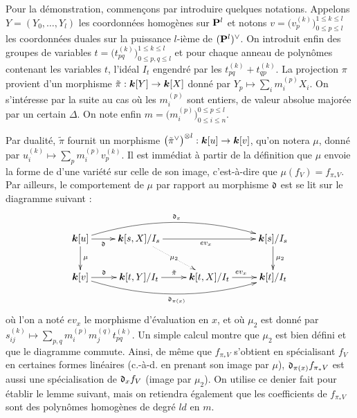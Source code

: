 Pour la démonstration, commençons par introduire quelques notations. Appelons
\( Y = (Y_0,\ldots, Y_l) \) les coordonnées homogènes sur \( {\mathbf{P}}^l \) et
notons \( v = \bigl(v_p^{(k)}\bigr)_{0\le p \le l}^{1 \le k \le l} \) les
coordonnées duales sur la puissance \( l \)-ième de \( ({\mathbf{P}}^l)^\vee \). On
introduit enfin des groupes de variables \( t = \bigl(t_{pq}^{(k)}\bigr)_{0\le
    p, q \le l}^{1 \le k \le l} \) et pour chaque anneau de polynômes
contenant les variables \( t \), l'idéal \( I_t \) engendré par les \(
  t_{pq}^{(k)} + t_{qp}^{(k)} \). La projection \( \pi \) provient d'un
morphisme \( \tilde\pi : {\boldsymbol k}[Y] \to {\boldsymbol k} [X] \) donné par \( Y_p \mapsto
  \sum_i m_i^{(p)} X_i \). On s'intéresse par la suite au cas où les \(
  m_i^{(p)} \) sont entiers, de valeur absolue majorée par un certain \(
  \Delta \). On note enfin \( m = \bigl(m_i^{(p)}\bigr)_{0\le i \le n}^{0 \le p
    \le l} \).

Par dualité, \( \tilde\pi \) fournit un morphisme \( \bigl(\tilde\pi^\vee
  \bigr)^{\otimes l} : {\boldsymbol k}[u] \to {\boldsymbol k}[v] \), qu'on notera \( \mu \), donné
par \( u_i^{(k)} \mapsto \sum_p m_i^{(p)} v_p^{(k)} \). Il est immédiat à
partir de la définition que \( \mu \) envoie la forme de  d'une
variété sur celle de son image, c'est-à-dire que \( \mu(f_V) = f_{\pi_* V} \).
Par ailleurs, le comportement de \( \mu \) par rapport au morphisme \( \mathfrak{d} \)
est se lit sur le diagramme suivant :
\begin{equation}
  \xymatrix{
    \cdn[u] \ar@/^4ex/[rrr]^{\md_x}
    \ar[r]_-\md
    \ar[d]^\mu
    & \cdn[s,X]/I_s \ar[rr]_{ev_x}
    \ar@{.>}[dr]|-{\mu_2}
    & & \cdn[s]/I_s \ar[d]^{\mu_2}
    \\
    \cdn[v]
    \ar@/_4ex/[rrr]_{\md_{\pi(x)}}
    \ar[r]^-\md
    & \cdn[t,Y]/I_t
    \ar[r]^{\tilde\pi}
    & \cdn[t, X]/I_t
    \ar[r]^{ev_x}
    & \cdn[t]/I_t
  }
\end{equation}
où l'on a noté \( ev_x \) le morphisme d'évaluation en \( x \), et où \( \mu_2
\) est donné par \( s_{ij}^{(k)} \mapsto \sum_{p, q} m_i^{(p)} m_j^{(q)}
  t_{pq}^{(k)} \).  Un simple calcul montre que \( \mu_2 \) est bien défini et
que le diagramme commute. Ainsi, de même que \( f_{\pi_* V} \) s'obtient en
spécialisant \( f_V \) en certaines formes linéaires (c.-à-d. en prenant son
image par \( \mu \)), \( \mathfrak{d}_{\pi(x)} f_{\pi_* V} \) est aussi une
spécialisation de \( \mathfrak{d}_x f_V \) (image par \( \mu_2 \)). On utilise ce
denier fait pour établir le lemme suivant, mais on retiendra également que les
coefficients de \( f_{\pi_* V} \) sont des polynômes homogènes de degré \( ld
\) en \( m \).

